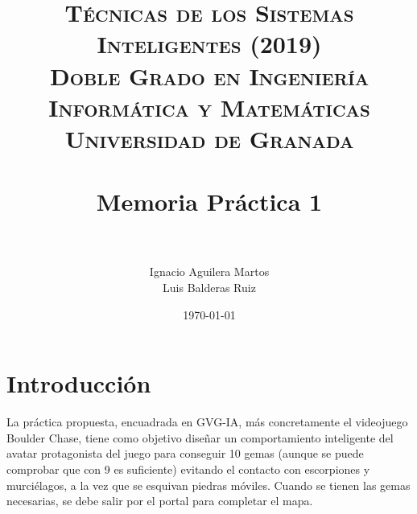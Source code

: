
\graphicspath{ {./images/} }
\usepackage{subcaption}
\usepackage[hidelinks]{hyperref}
\usepackage{soul}



\title{	
\normalfont \normalsize 
\textsc{\textbf{Técnicas de los Sistemas Inteligentes (2019)} \\ Doble Grado en Ingeniería Informática y Matemáticas \\ Universidad de Granada} \\ [25pt] %
\horrule{0.5pt} \\[0.4cm] %
\huge Memoria Práctica 1 \\ %
\horrule{2pt} \\[0.5cm] %
}

\author{Ignacio Aguilera Martos \\ Luis Balderas Ruiz} 


\date{\normalsize\today} %




\maketitle %

\newpage %

\tableofcontents %

\listoffigures

\newpage

\section{Introducción}

La práctica propuesta, encuadrada en GVG-IA, más concretamente el videojuego Boulder Chase, tiene como objetivo diseñar un comportamiento inteligente del avatar protagonista del juego para conseguir 10 gemas (aunque se puede comprobar que con 9 es suficiente) evitando el contacto con escorpiones y murciélagos, a la vez que se esquivan piedras móviles. Cuando se tienen las gemas necesarias, se debe salir por el portal para completar el mapa. \\

